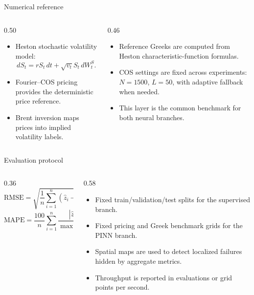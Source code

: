 \begin{frame}{Numerical reference}
  \begin{columns}[T,onlytextwidth]
    \begin{column}{0.50\textwidth}
      \begin{itemize}
        \item Heston stochastic volatility model:
        \[
          dS_t = rS_t\,dt+\sqrt{v_t}S_t\,dW_t^{S}.
        \]
        \item Fourier--COS pricing provides the deterministic price reference.
        \item Brent inversion maps prices into implied volatility labels.
      \end{itemize}
    \end{column}
    \begin{column}{0.46\textwidth}
      \begin{itemize}
        \item Reference Greeks are computed from Heston characteristic-function formulas.
        \item COS settings are fixed across experiments: \(N=1500\), \(L=50\), with adaptive fallback when needed.
        \item This layer is the common benchmark for both neural branches.
      \end{itemize}
    \end{column}
  \end{columns}
\end{frame}

\begin{frame}{Evaluation protocol}
  \begin{columns}[T,onlytextwidth]
    \begin{column}{0.36\textwidth}
      \[
      \mathrm{RMSE} =
      \sqrt{\frac{1}{n}\sum_{i=1}^{n}(\hat z_i-z_i^{\mathrm{ref}})^2}
      \]
      \[
      \mathrm{MAPE} =
      \frac{100}{n}\sum_{i=1}^{n}
      \frac{|\hat z_i-z_i^{\mathrm{ref}}|}
      {\max(|z_i^{\mathrm{ref}}|,\varepsilon)}
      \]
    \end{column}
    \begin{column}{0.58\textwidth}
      \begin{itemize}
        \item Fixed train/validation/test splits for the supervised branch.
        \item Fixed pricing and Greek benchmark grids for the PINN branch.
        \item Spatial maps are used to detect localized failures hidden by aggregate metrics.
        \item Throughput is reported in evaluations or grid points per second.
      \end{itemize}
    \end{column}
  \end{columns}
\end{frame}
